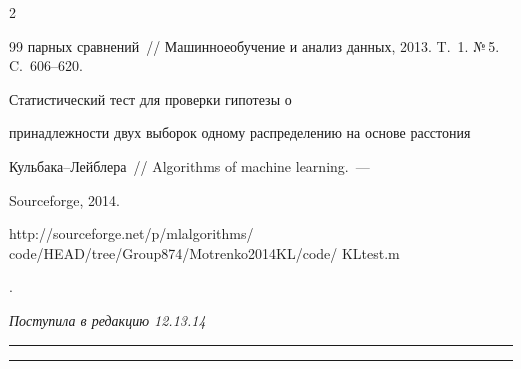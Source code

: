 \begin{multicols}{2}
{{\begin{thebibliography}{99}
парных сравнений~// Машинное\linebreak обучение и анализ данных, 2013.  T.~1. №\,5.  C.~606--620.




 Статистический тест для проверки гипотезы о

принадлежности двух выборок одному распределению на основе расстония

Кульбака--Лейблера~// Algorithms of machine learning.~---

Sourceforge, 2014.

{\sf

http://sourceforge.net/p/mlalgorithms/ code/HEAD/tree/Group874/Motrenko2014KL/code/ KLtest.m}.





\end{thebibliography}

} }



\end{multicols}



\vspace*{-6pt}



\hfill{\small\textit{Поступила в редакцию 12.13.14}}








\vspace*{12pt}



\hrule



\vspace*{2pt}



\hrule





\def\tit{OBTAINING AN AGGREGATED FORECAST OF RAILWAY FREIGHT TRANSPORTATION USING KULLBACK--LEIBLER DISTANCE}



\def\titkol{Obtaining an aggregated forecast of railway freight transportation using Kullback--Leibler distance}



\def\aut{A.\,P.~Motrenko$^1$ and~V.\,V.~Strijov$^2$}

